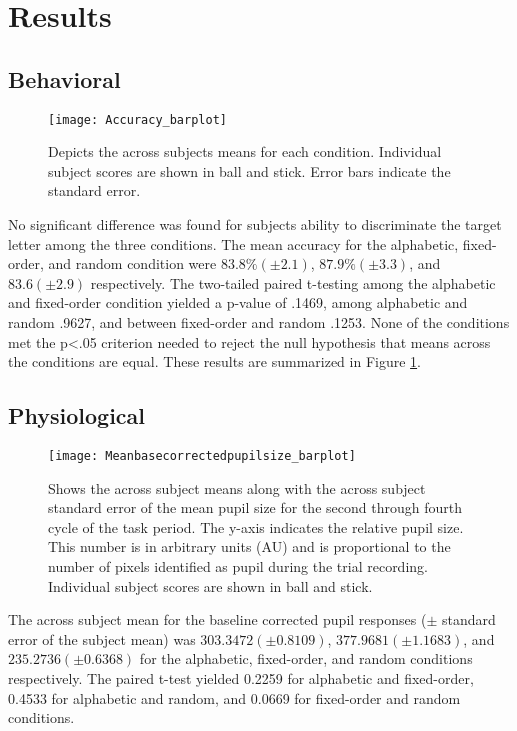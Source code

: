 \documentclass[10pt]{article}
\begin{document}
\section{Results}

\subsection{Behavioral}

\begin{figure}[t]
  \centering
  \texttt{[image: Accuracy\_barplot]}
  \caption{Depicts the across subjects means for each
  condition.  Individual subject scores are shown in ball and stick.  Error bars
  indicate the standard error.}
  \label{accuracy}
\end{figure}

No significant difference was found for subjects ability to
discriminate the target letter among the three conditions.
The mean accuracy for the alphabetic, fixed-order, and random
condition were $83.8 \% (\pm2.1)$, $87.9 \% (\pm3.3)$,
and $83.6 (\pm 2.9)$ respectively.  The two-tailed paired t-testing among 
the alphabetic and fixed-order condition yielded a p-value of .1469,
among alphabetic and random .9627, and between fixed-order and
random .1253.  None of the conditions met the p<.05 criterion needed
to reject the null hypothesis that means across the conditions are
equal. These results are summarized in Figure \ref{accuracy}.

\subsection{Physiological}
\begin{figure}[t]
  \centering
  \texttt{[image: Meanbasecorrectedpupilsize\_barplot]}
  \caption{Shows the across subject means along with the across
  subject standard error of the mean pupil size for the second
  through fourth cycle of the task period. The y-axis indicates the
  relative pupil size.  This number is in arbitrary units (AU) and
  is proportional to the number of pixels identified as pupil during
  the trial recording. Individual subject scores are shown in ball and stick. }
  \label{psBarplot}
\end{figure}

The across subject mean for the baseline corrected pupil responses
($\pm$ standard error of the subject mean) was $ 303.3472 (\pm 0.8109)$,
$377.9681 (\pm 1.1683)$, and $235.2736 (\pm 0.6368)$ for the alphabetic,
fixed-order, and random conditions respectively.
The paired t-test
yielded 0.2259 for alphabetic and fixed-order, 0.4533 for alphabetic
and random, and 0.0669 for fixed-order and random conditions.
\end{document}
